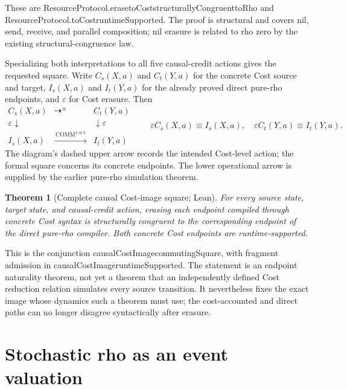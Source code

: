 \documentclass[11pt]{article}
\newtheorem{theorem}{Theorem}[section]
\newcommand{\leanname}[1]{{\scriptsize\ttfamily
  \def\_{\textunderscore\allowbreak}#1}}
\begin{document}
These are
\leanname{ResourceProtocol.erase\_toCost\_structurallyCongruent\_toRho} and
\leanname{ResourceProtocol.toCost\_runtimeSupported}.  The proof is structural
and covers nil, send, receive, and parallel composition; nil erasure is
related to rho zero by the existing structural-congruence law.

Specializing both interpretations to all five causal-credit actions gives the
requested square.  Write \(C_s(X,a)\) and \(C_t(Y,a)\) for the concrete Cost
source and target, \(I_s(X,a)\) and \(I_t(Y,a)\) for the already proved direct
pure-rho endpoints, and \(\varepsilon\) for Cost erasure.  Then
\[
\begin{array}{ccc}
C_s(X,a) & \dashrightarrow^{\ a\ } & C_t(Y,a) \\
{\scriptstyle\varepsilon}\downarrow & &
  \downarrow{\scriptstyle\varepsilon} \\
I_s(X,a) & \xrightarrow{\ \mathrm{COMM}^{1\ \mathrm{or}\ 3}\ } & I_t(Y,a)
\end{array}
\qquad
\varepsilon C_s(X,a)\equiv I_s(X,a),\quad
\varepsilon C_t(Y,a)\equiv I_t(Y,a).
\]
The diagram's dashed upper arrow records the intended Cost-level action; the
formal square concerns its concrete endpoints.  The lower operational arrow
is supplied by the earlier pure-rho simulation theorem.

\begin{theorem}[Complete causal Cost-image square; Lean]
For every source state, target state, and causal-credit action, erasing each
endpoint compiled through concrete Cost syntax is structurally congruent to
the corresponding endpoint of the direct pure-rho compiler.  Both concrete
Cost endpoints are runtime-supported.
\end{theorem}

This is the conjunction
\leanname{causalCostImage\_commutingSquare}, with fragment admission in
\leanname{causalCostImage\_runtimeSupported}.  The statement is an endpoint
naturality theorem, not yet a theorem that an independently defined Cost
reduction relation simulates every source transition.  It nevertheless fixes
the exact image whose dynamics such a theorem must use; the cost-accounted and
direct paths can no longer disagree syntactically after erasure.

\section{Stochastic rho as an event valuation}
\label{sec:stochastic-rho}
\end{document}
